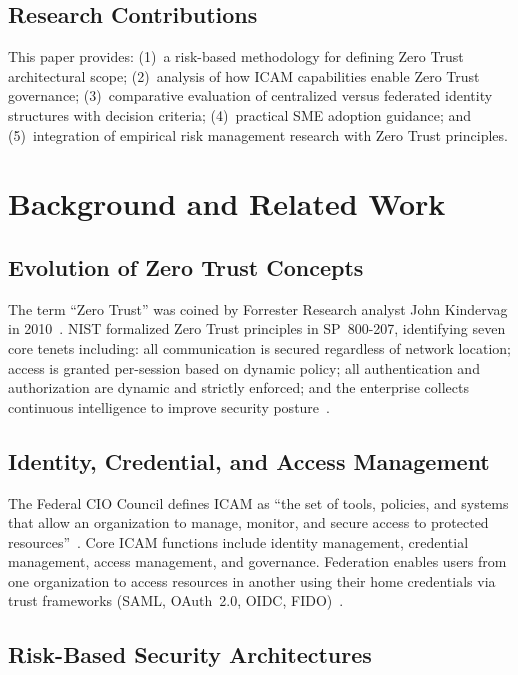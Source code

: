 \documentclass[journal]{IEEEtran}
\begin{document}
\subsection{Research Contributions}

This paper provides: (1)~a risk-based methodology for defining Zero Trust architectural
scope; (2)~analysis of how ICAM capabilities enable Zero Trust governance; (3)~comparative
evaluation of centralized versus federated identity structures with decision criteria;
(4)~practical SME adoption guidance; and (5)~integration of empirical risk management
research with Zero Trust principles.

\section{Background and Related Work}

\subsection{Evolution of Zero Trust Concepts}

The term ``Zero Trust'' was coined by Forrester Research analyst John Kindervag in
2010~\cite{kindervag2010}. NIST formalized Zero Trust principles in SP~800-207,
identifying seven core tenets including: all communication is secured regardless of
network location; access is granted per-session based on dynamic policy; all
authentication and authorization are dynamic and strictly enforced; and the enterprise
collects continuous intelligence to improve security posture~\cite{rose2020zero}.

\subsection{Identity, Credential, and Access Management}

The Federal CIO Council defines ICAM as ``the set of tools, policies, and systems that
allow an organization to manage, monitor, and secure access to protected
resources''~\cite{ficam2021}. Core ICAM functions include identity management,
credential management, access management, and governance. Federation enables users from
one organization to access resources in another using their home credentials via trust
frameworks (SAML, OAuth~2.0, OIDC, FIDO)~\cite{pingidentity2024}.

\subsection{Risk-Based Security Architectures}
\end{document}
